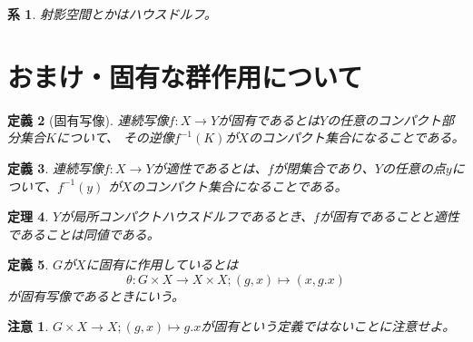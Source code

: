 \documentclass[leqno]{jsarticle}
\newtheorem{thm}{定理}
\newtheorem{cor}[thm]{系}
\newtheorem{df}[thm]{定義}
\newtheorem*{cau}{注意}
\begin{document}
\begin{cor}
射影空間とかはハウスドルフ。
\end{cor}

\section{おまけ・固有な群作用について}
\begin{df}[固有写像]
連続写像$f:X\to Y$が固有であるとは$Y$の任意のコンパクト部分集合$K$について、
その逆像$f^{-1}(K)$が$X$のコンパクト集合になることである。
\end{df}
\begin{df}
連続写像$f:X\to Y$が適性であるとは、$f$が閉集合であり、$Y$の任意の点$y$について、$f^{-1}(y)$
が$X$のコンパクト集合になることである。
\end{df}
\begin{thm}
$Y$が局所コンパクトハウスドルフであるとき、$f$が固有であることと適性であることは同値である。
\end{thm}
\begin{df}
$G$が$X$に固有に作用しているとは
\[
\theta: G\times X\to X\times X; (g, x)\mapsto (x, g.x)
\]
が固有写像であるときにいう。
\end{df}
\begin{cau}
$G\times X\to X; (g,x)\mapsto g.x$が固有という定義ではないことに注意せよ。
\end{cau}
\end{document}
